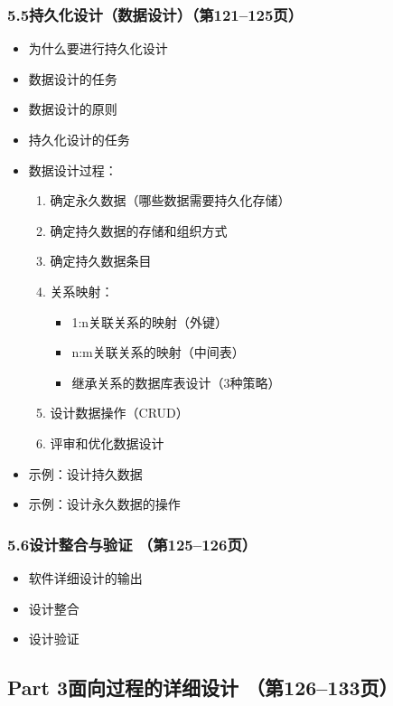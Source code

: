 \documentclass[12pt,a4paper]{ctexart}
\begin{document}
\subsubsection{5.5\quad 持久化设计（数据设计）\hfill（第121--125页）}
\begin{itemize}
    \item 为什么要进行持久化设计
    \item 数据设计的任务
    \item 数据设计的原则
    \item 持久化设计的任务
    \item 数据设计过程：
    \begin{enumerate}
        \item 确定永久数据（哪些数据需要持久化存储）
        \item 确定持久数据的存储和组织方式
        \item 确定持久数据条目
        \item 关系映射：
        \begin{itemize}
            \item 1:n关联关系的映射（外键）
            \item n:m关联关系的映射（中间表）
            \item 继承关系的数据库表设计（3种策略）
        \end{itemize}
        \item 设计数据操作（CRUD）
        \item 评审和优化数据设计
    \end{enumerate}
    \item 示例：设计持久数据
    \item 示例：设计永久数据的操作
\end{itemize}

\subsubsection{5.6\quad 设计整合与验证 \hfill（第125--126页）}
\begin{itemize}
    \item 软件详细设计的输出
    \item 设计整合
    \item 设计验证
\end{itemize}

\subsection{Part 3\quad 面向过程的详细设计 \hfill（第126--133页）}
\end{document}
